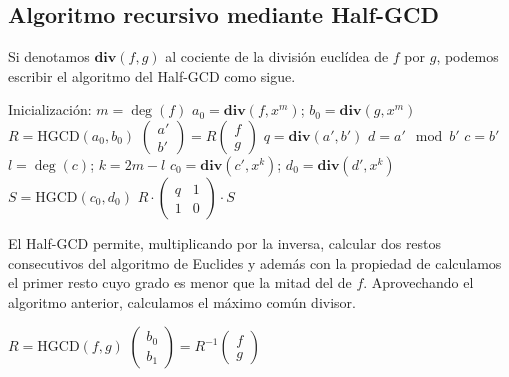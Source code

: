 \documentclass[10pt]{article}
\theoremstyle{definition}
\begin{document}
\subsection{Algoritmo recursivo mediante Half-GCD}
Si denotamos $\textbf{div}(f,g)$ al cociente de la división euclídea de $f$ por $g$, podemos escribir el algoritmo del Half-GCD como sigue. 
\begin{center}
\begin{algorithm}[H]
\SetAlgoLined\DontPrintSemicolon
{}
 Inicialización: $m=\deg(f)$\;
  $a_0 = \textbf{div}(f,x^m)$;
  $b_0 = \textbf{div}(g,x^m)$\;
  $R =\text{HGCD}(a_0,b_0)$\;
  $\begin{pmatrix}a'\\ b'\end{pmatrix}=R\begin{pmatrix}f\\ g\end{pmatrix}$\;
  $q=\textbf{div}(a',b')$\;
  $d=a'\mod b'$\;
  $c=b'$\;
  $l=\deg(c)$;
  $k=2m-l$\;
  $c_0=\textbf{div}(c',x^k)$; 
  $d_0=\textbf{div}(d',x^k)$\;
  $S=\text{HGCD}(c_0,d_0)$\;
  \Return $R\cdot \begin{pmatrix}q & 1\\ 1 & 0
  \end{pmatrix}\cdot S$
\end{algorithm}\end{center}
El Half-GCD permite, multiplicando por la inversa, calcular dos restos consecutivos del algoritmo de Euclides y además con la propiedad de calculamos el primer resto cuyo grado es menor que la mitad del de $f$.
Aprovechando el algoritmo anterior, calculamos el máximo común divisor.
\begin{center}
\begin{algorithm}[H]
\SetAlgoLined\DontPrintSemicolon
{}
$R=\text{HGCD}(f,g)$\;
$\begin{pmatrix}b_0\\ b_1\end{pmatrix}=R^{-1}\begin{pmatrix}f\\ g\end{pmatrix}$\;
\end{algorithm}\end{center}
\end{document}
